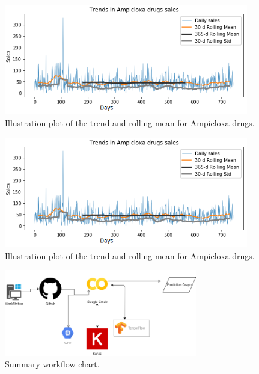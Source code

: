 \documentclass[12pt]{report}
\begin{document}
\begin{figure}[H]%
  \begin {center}
  \includegraphics[width=0.95\textwidth]{images/download (12)A.png}
  \caption{Illustration plot of the trend and rolling mean for Ampicloxa drugs.}
  \label{fig:ecg}
  \end {center}
\end{figure}

\begin{figure}[H]%
  \begin {center}
  \includegraphics[width=0.95\textwidth]{images/download (12)B.png}
  \caption{Illustration plot of the trend and rolling mean for Ampicloxa drugs.}
  \label{fig:ecg}
  \end {center}
\end{figure}


\begin{figure}[H]%
  \begin {center}
  \includegraphics[width=0.75\textwidth]{images/new.png}
  \caption{Summary workflow chart.}
  \label{fig:ecg}
  \end {center}
\end{figure}
\end{document}
